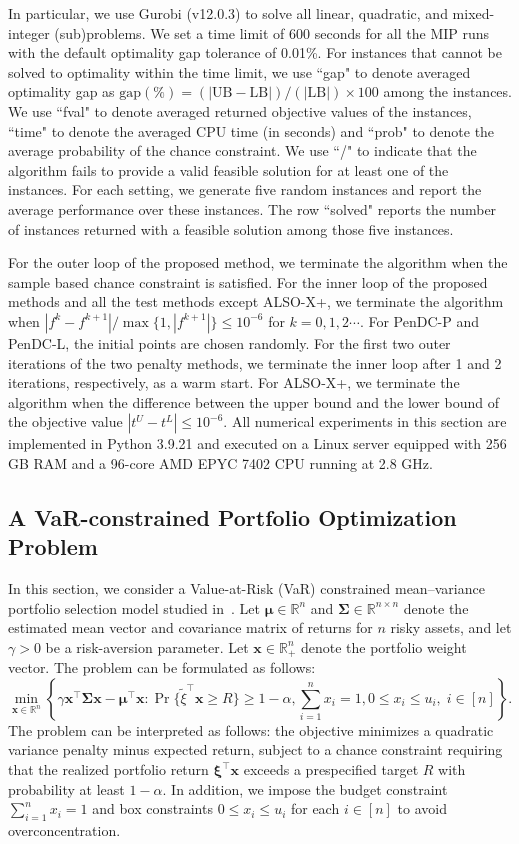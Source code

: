 \documentclass[11pt]{article}
\def\bs{\boldsymbol}
\def\Re{\mathbb{R}}
\def\txi{\tilde{\xi}}
\begin{document}
In particular, we use Gurobi (v12.0.3) to solve all linear, quadratic, and mixed-integer (sub)problems. We set a time limit of 600 seconds for all the MIP runs with the default optimality gap tolerance of 0.01\%. For instances that cannot be solved to optimality within the time limit, we use ``gap" to denote averaged optimality gap as $\textrm{gap} (\%)=(| \textrm{UB} -\textrm{LB} |)/(|\textrm{LB}|)\times 100$ among the instances. We use ``fval" to denote averaged returned objective values of the instances, ``time" to denote the averaged CPU time (in seconds) and ``prob" to denote the average probability of the chance constraint. We use ``/" to indicate that the algorithm fails to provide a valid feasible solution for at least one of the instances. For each setting, we generate five random instances and report the average performance over these instances. The row ``solved" reports the number of instances returned with a feasible solution among those five instances.

For the outer loop of the proposed method, we terminate the algorithm when the sample based chance constraint is satisfied. For the inner loop of the proposed methods and all the test methods except ALSO-X+, we terminate the algorithm when $|f^k - f^{k+1}|/\max\{1,|f^{k+1}|\} \leq 10^{-6}$ for $k = 0, 1, 2\cdots$. For PenDC-P and PenDC-L, the initial points are chosen randomly. For the first two outer iterations of the two penalty methods, we terminate the inner loop after 1 and 2 iterations, respectively, as a warm start. For ALSO-X+, we terminate the algorithm when the difference between the upper bound and the lower bound of the objective value $|t^U - t^L| \leq 10^{-6}$. All numerical experiments in this section are implemented in Python 3.9.21 and executed on a Linux server equipped with 256 GB RAM and
a 96-core AMD EPYC 7402 CPU running at 2.8 GHz.

\subsection{A VaR-constrained Portfolio Optimization Problem}

In this section, we consider a Value-at-Risk (VaR) constrained mean--variance portfolio selection model studied in~\cite{bai2021augmented, wang2025proximal}. Let $\bs{\mu}\in\Re^n$ and $\boldsymbol{\Sigma}\in\Re^{n\times n}$ denote the estimated mean vector and covariance matrix of returns for $n$ risky assets, and let $\gamma>0$ be a risk-aversion parameter. Let $\bs{x}\in\Re^n_{+}$ denote the portfolio weight vector. The problem can be formulated as follows:
\[
\min_{\bs{x}\in\Re^n}\left\{\gamma \bs{x}^\top \boldsymbol{\Sigma}\bs{x} - \bs{\mu}^\top \bs{x}: \Pr\{\txi^\top \bs{x} \geq R\} \geq 1-\alpha, \sum^n_{i=1}x_i = 1, 0 \leq x_i \leq u_i, \; i\in[n]\right\}.
\]
The problem can be interpreted as follows: the objective minimizes a quadratic variance penalty minus expected return, subject to a chance constraint requiring that the realized portfolio return $\boldsymbol{\xi}^\top \bs{x}$ exceeds a prespecified target $R$ with probability at least $1-\alpha$. In addition, we impose the budget constraint $\sum_{i=1}^n x_i=1$ and box constraints $0\le x_i\le u_i$ for each $i\in[n]$ to avoid overconcentration.
\end{document}
